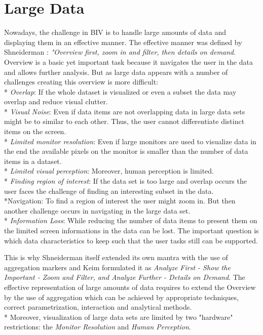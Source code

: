 \section{Large Data}
Nowadays, the challenge in BIV is to handle large amounts of data and displaying them in an effective manner. The effective manner was defined by Shneiderman \cite{paterno1997concurtasktrees, Shneiderman2008, Keim2008}: \textit{"Overview first, zoom in and filter, then details on demand}. Overview is a basic yet important task because it navigates the user in the data and allows further analysis.  But as large data appears with a number of challenges creating this overview is more difficult\label{problems}:
\\*
\textit{Overlap}: 
If the whole dataset is visualized or even a subset the data may overlap and reduce visual clutter.
\\*
\textit{Visual Noise}: 
Even if data items are not overlapping data in large data sets might be to similar to each other. Thus, the user cannot differentiate distinct items on the screen.
\\*
\textit{Limited monitor resolution}:
Even if large monitors are used to visualize data in the end the available pixels on the monitor is smaller than the number of data items in a dataset. 
\\*
\textit{Limited visual perception}:
Moreover, human perception is limited.
\\*
\textit{Finding region of interest}:
If the data set is too large and overlap occurs the user faces the challenge of finding an interesting subset in the data.
\\*{Navigation}:
To find a region of interest the user might zoom in. But then another challenge occurs in navigating in the large data set.
\\*
\textit{Information Loss}:
While reducing the number of data items to present them on the limited screen informations in the data can be lost. The important question is which data characteristics to keep such that the user tasks still can be supported.

This is why Shneiderman itself extended its own mantra with the use of aggregation markers and Keim formulated it as \textit{Analyze First - Show the Important - Zoom and Filter, and Analyze Further - Details on Demand}\cite{Keima}. The effective representation of large amounts of data requires to extend the Overview by the use of aggregation which can be achieved by appropriate techniques, correct parametrization, interaction and analytical methods\cite{Aigner2008}. 
\\*
Moreover, visualization of large data sets are limited by two "hardware" restrictions: the \textit{Monitor Resolution} and \textit{Human Perception}.

